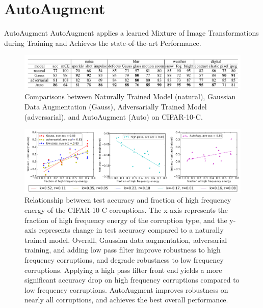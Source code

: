 \documentclass[8pt]{beamer}
\begin{document}
\section{AutoAugment}
\begin{frame}[allowframebreaks]{AutoAugment}
\qqaud AutoAugment applies a learned Mixture of Image Transformations during Training and Achieves the state-of-the-art Performance.

\begin{figure}
    \centering
    \includegraphics[scale=0.25]{../Images/Results.png}
    \caption{Comparisons between Naturally Trained Model (natural), Gaussian Data Augmentation (Gauss), Adversarially Trained Model (adversarial), and AutoAugment (Auto) on CIFAR-10-C.}
\end{figure}

\framebreak

\begin{figure}
    \centering
    \includegraphics[scale=0.25]{../Images/FrequencyResults.png}
    \caption{Relationship between test accuracy and fraction of high frequency energy of the CIFAR-10-C corruptions. The x-axis represents the fraction of high frequency energy of the corruption type, and the y-axis represents change in test accuracy compared to a naturally trained model. Overall, Gaussian data augmentation, adversarial training, and adding low pass filter improve robustness to high frequency corruptions, and degrade robustness to low frequency corruptions. Applying a high pass filter front end yields a more significant accuracy drop on high frequency corruptions compared to low frequency corruptions. AutoAugment improves robustness on nearly all corruptions, and achieves the best overall performance.}
\end{figure}
\end{frame}
\end{document}
